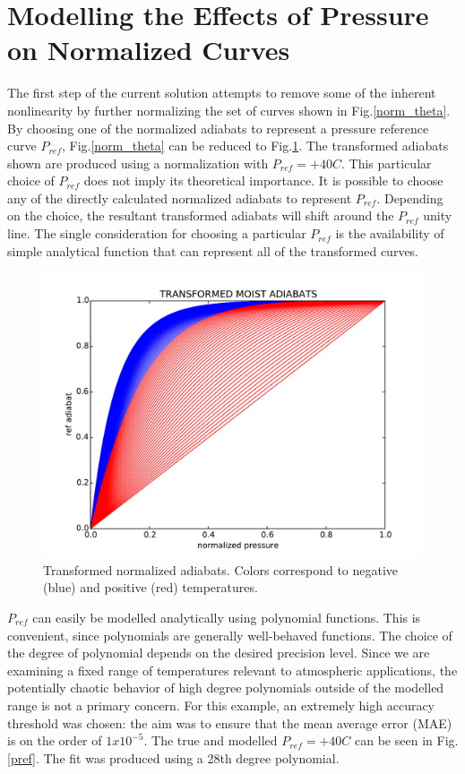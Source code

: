 \documentclass{article}
\begin{document}
\section*{Modelling the Effects of Pressure on Normalized Curves}
The first step of the current solution attempts to remove some of the inherent nonlinearity by further normalizing the set of curves shown in Fig.\ref{norm_theta}. By choosing one of the normalized adiabats to represent a pressure reference curve $P_{ref}$, Fig.\ref{norm_theta} can be reduced to Fig.\ref{trans_adiabats}. The transformed adiabats shown are produced using a normalization with $P_{ref} = +40C $. This particular choice of $P_{ref}$ does not imply its theoretical importance. It is possible to choose any of the directly calculated normalized adiabats to represent $P_{ref}$. Depending on the choice, the resultant transformed adiabats will shift around the $P_{ref}$ unity line. The single consideration for choosing a particular $P_{ref}$ is the availability of simple analytical function that can represent all of the transformed curves. 

\begin{figure}
\centering
\includegraphics[width=4.5in]{../figs/trans_adiabats.pdf}
\caption{Transformed normalized adiabats. Colors correspond to negative (blue) and positive (red) temperatures.}\label{trans_adiabats}
\end{figure}

$P_{ref}$ can easily be modelled analytically using polynomial functions. This is convenient, since polynomials are generally well-behaved functions. The choice of the degree of polynomial depends on the desired precision level. Since we are examining a fixed range of temperatures relevant to atmospheric applications, the potentially chaotic behavior of high degree polynomials outside of the modelled range is not a primary concern. For this example, an extremely high accuracy threshold was chosen: the aim was to ensure that the mean average error (MAE) is on the order of $1x10^{-5}$. The true and modelled $P_{ref} = +40C$ can be seen in Fig.\ref{pref}. The fit was produced using a 28th degree polynomial. 
\end{document}
